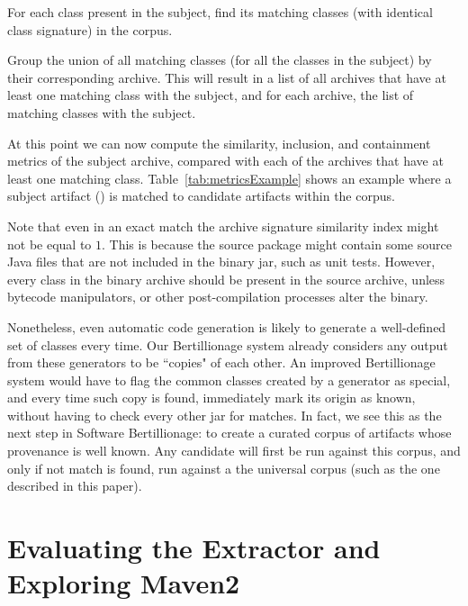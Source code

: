 \begin{compactenum}

\item For each class present in the subject, find its matching classes
    (with identical class signature) in the corpus.

\item Group the union of all matching classes (for all the classes in the
    subject) by their corresponding archive. This will result in a list of
    all archives that have at least one matching class with the subject,
    and for each archive, the list of matching classes with the subject.

\end{compactenum}

At this point we can now compute the similarity, inclusion, and containment
metrics of
the subject archive, compared with each of the archives that have at least one
matching class.  Table~\ref{tab:metricsExample} shows an example where a
subject artifact () is matched to candidate artifacts
within the corpus.

Note that even in an exact match the archive signature similarity index
might not be equal to $1$. This is because the source package might contain
some source Java files that are not included in the binary jar, such as
unit tests.  However, every class in the binary archive should be present
in the source archive, unless bytecode manipulators, or other post-compilation
processes alter the binary.

Nonetheless, even automatic code generation is likely to generate a well-defined set of
classes every time.
Our Bertillionage system already considers any output from these generators
to be ``copies" of each other. An improved Bertillionage system would
have to flag the common classes created by a generator as special, and
every time such copy is found, immediately mark its origin as known,
without having to check every other jar for matches. In fact, we see
this as the next step in Software Bertillionage: to create a curated
corpus of artifacts whose provenance is well known. Any candidate will
first be run against this corpus, and only if not match is found, run
against a the universal corpus (such as the one described in this
paper).


\section{Evaluating the Extractor and Exploring Maven2}
\label{sec:mavenExplore}


